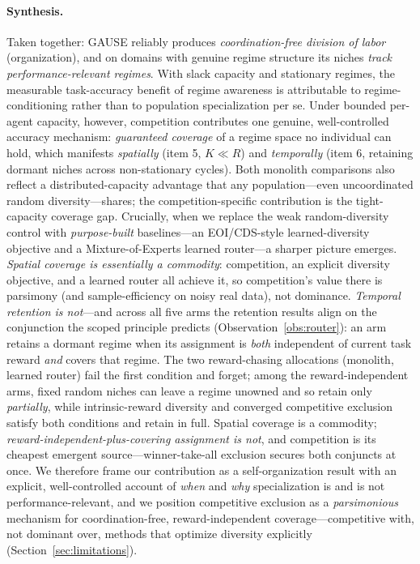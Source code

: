 \documentclass{article}
\begin{document}
\paragraph{Synthesis.} Taken together: GAUSE reliably produces
\emph{coordination-free division of labor} (organization), and on domains with
genuine regime structure its niches \emph{track performance-relevant regimes}.
With slack capacity and stationary regimes, the measurable task-accuracy benefit
of regime awareness is attributable to regime-conditioning rather than to
population specialization per se. Under bounded per-agent capacity, however,
competition contributes one genuine, well-controlled accuracy mechanism:
\emph{guaranteed coverage} of a regime space no individual can hold, which
manifests \emph{spatially} (item 5, $K\ll R$) and \emph{temporally} (item 6,
retaining dormant niches across non-stationary cycles). Both monolith comparisons
also reflect a distributed-capacity advantage that any population---even
uncoordinated random diversity---shares; the competition-specific contribution is
the tight-capacity coverage gap. Crucially, when we replace the weak
random-diversity control with \emph{purpose-built} baselines---an EOI/CDS-style
learned-diversity objective and a Mixture-of-Experts learned router---a sharper
picture emerges. \emph{Spatial coverage is essentially a commodity}: competition,
an explicit diversity objective, and a learned router all achieve it, so
competition's value there is parsimony (and sample-efficiency on noisy real data),
not dominance. \emph{Temporal retention is not}---and across all five arms the
retention results align on the conjunction the scoped principle predicts
(Observation~\ref{obs:router}): an arm retains a dormant regime when its
assignment is \emph{both} independent of current task reward \emph{and} covers
that regime. The two reward-chasing allocations (monolith, learned router) fail
the first condition and forget; among the reward-independent arms, fixed random
niches can leave a regime unowned and so retain only \emph{partially}, while
intrinsic-reward diversity and converged competitive exclusion satisfy both
conditions and retain in full. Spatial coverage is a commodity;
\emph{reward-independent-plus-covering assignment is not}, and competition is its
cheapest emergent source---winner-take-all exclusion secures both conjuncts at
once. We therefore frame our contribution as
a self-organization result with an explicit, well-controlled account of
\emph{when} and \emph{why} specialization is and is not performance-relevant, and
we position competitive exclusion as a \emph{parsimonious} mechanism for
coordination-free, reward-independent coverage---competitive with, not dominant
over, methods that optimize diversity explicitly (Section~\ref{sec:limitations}).
\end{document}

